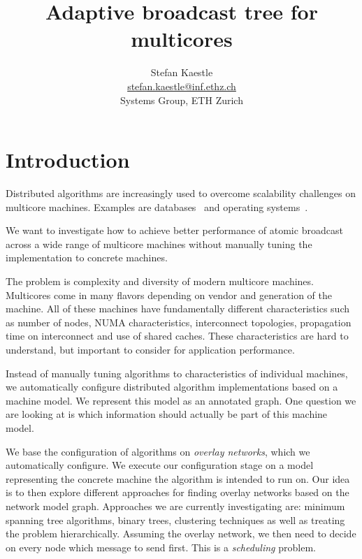 \documentclass{article}
\begin{document}
\title{Adaptive broadcast tree for multicores}

\newcommand{\eaddr}{stefan.kaestle@inf.ethz.ch}
\newcommand{\email}{\href{mailto:\eaddr}{\eaddr}}

\author{Stefan Kaestle\\
  \email \\
  Systems Group, ETH Zurich}

\maketitle


\section{Introduction}

Distributed algorithms are increasingly used to overcome scalability
challenges on multicore machines. Examples are
databases~\cite{Salomie2011, Wiesmann2000} and operating
systems~\cite{fos:osr09, tornado:osdi99, barrelfish:sosp09}.

We want to investigate how to achieve better performance of atomic
broadcast across a wide range of multicore machines without manually
tuning the implementation to concrete machines.

The problem is complexity and diversity of modern multicore
machines. Multicores come in many flavors depending on vendor and
generation of the machine. All of these machines have fundamentally
different characteristics such as number of nodes, NUMA
characteristics, interconnect topologies, propagation time on
interconnect and use of shared caches. These characteristics are hard
to understand, but important to consider for application performance. 

Instead of manually tuning algorithms to characteristics of individual
machines, we automatically configure distributed algorithm
implementations based on a machine model. We represent this model as an
annotated graph. One question we are looking at is which information
should actually be part of this machine model.

We base the configuration of algorithms on \emph{overlay networks}, which we
automatically configure. We execute our configuration stage on a model
representing the concrete machine the algorithm is intended to run
on. %
Our idea is to then explore different approaches for finding overlay
networks based on the network model graph. Approaches we are currently
investigating are: minimum spanning tree algorithms, binary trees,
clustering techniques as well as treating the problem
hierarchically. Assuming the overlay network, we then need to decide
on every node which message to send first. This is a \emph{scheduling}
problem.
\end{document}

